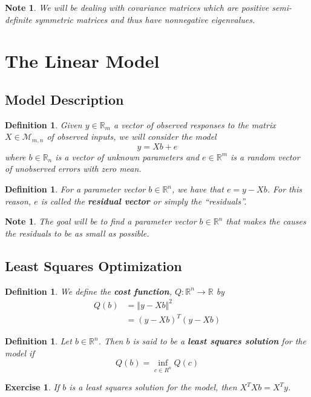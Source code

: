 \documentclass[12pt]{amsart}
\newtheorem{defn}[thm]{Definition}
\newtheorem{note}[thm]{Note}
\newtheorem{ex}[thm]{Exercise}
\newcommand{\R}{\mathbb{R}}
\newcommand{\MM}{\mathcal{M}}
\newcommand{\n}{\Vert}
\begin{document}
\begin{note}
We will be dealing with covariance matrices which are positive semi-definite symmetric matrices and thus have nonnegative eigenvalues.
\end{note}

\section{The Linear Model}
\subsection{Model Description}
\begin{defn}
Given $y \in \R_m$ a vector of observed responses to the matrix $X \in \MM_{m,n}$ of observed inputs, we will consider the model $$y = Xb +e$$ where $b \in \R_n$ is a vector of unknown parameters and $e \in \R^m$ is a random vector of unobserved errors with zero mean. 
\end{defn}

\begin{defn}
For a parameter vector $b \in \R^n$, we have that  $e = y-Xb$. For this reason, $e$ is called the \textbf{residual vector} or simply the ``residuals''.
\end{defn}

\begin{note}
The goal will be to find a parameter vector $b \in \R^n$ that makes the causes the residuals to be as small as possible.  
\end{note}

\subsection{Least Squares Optimization}

\begin{defn}
We define the \textbf{cost function}, $Q: \R^n \rightarrow \R$ by 
\begin{align*}
Q(b) 
&= \n y - Xb \n ^2 \\
&= (y - Xb )^T(y - Xb )
\end{align*}
\end{defn}

\begin{defn}
Let $b \in \R^n$. Then $b$ is said to be a \textbf{least squares solution} for the model if $$Q(b) = \inf_{c \in R^{n}} Q(c)$$ 
\end{defn}

\begin{ex}
If $b$ is a least squares solution for the model, then $X^TXb = X^Ty$.
\end{ex}
\end{document}
